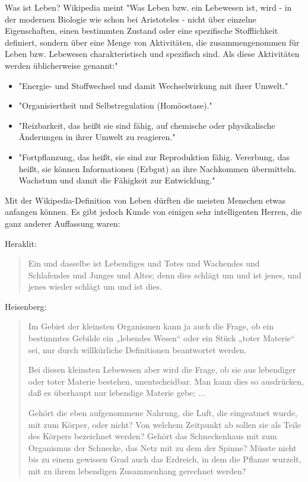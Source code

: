 \documentclass[12pt]{book}
\begin{document}
Was ist Leben? Wikipedia meint
"Was Leben bzw. ein Lebewesen ist, wird - in der modernen Biologie wie schon bei Aristoteles - nicht über einzelne Eigenschaften, einen bestimmten Zustand oder eine spezifische Stofflichkeit definiert, sondern über eine Menge von Aktivitäten, die zusammengenommen für Leben bzw. Lebewesen charakteristisch und spezifisch sind. Als diese Aktivitäten werden üblicherweise genannt:"
\begin{itemize}
\item "Energie- und Stoffwechsel und damit Wechselwirkung mit ihrer Umwelt."
\item "Organisiertheit und Selbstregulation (Homöostase)."
\item "Reizbarkeit, das heißt sie sind fähig, auf chemische oder physikalische Änderungen in ihrer Umwelt zu reagieren."
\item "Fortpflanzung, das heißt, sie sind zur Reproduktion fähig.
Vererbung, das heißt, sie können Informationen (Erbgut) an ihre Nachkommen übermitteln.
Wachstum und damit die Fähigkeit zur Entwicklung."
\end{itemize}

Mit der Wikipedia-Definition von Leben dürften die meisten Menschen etwas anfangen können. Es gibt jedoch Kunde von einigen sehr intelligenten Herren, die ganz anderer Auffassung waren:

Heraklit:
\begin{quote}\begin{tcolorbox}
Ein und dasselbe ist Lebendiges und Totes und Wachendes und Schlafendes und Junges und Altes; denn dies schlägt um und ist jenes, und jenes wieder schlägt um und ist dies.
\end{tcolorbox}\end{quote}
Heisenberg:
\begin{quote}\begin{tcolorbox}
Im Gebiet der kleinsten Organismen kann ja auch die Frage, ob ein bestimmtes Gebilde ein „lebendes Wesen“ oder ein Stück „toter Materie“ sei, nur durch willkürliche Definitionen beantwortet werden.

Bei diesen kleinsten Lebewesen aber wird die Frage, ob sie aus lebendiger oder toter Materie bestehen, unentscheidbar. Man kann dies so ausdrücken, daß es überhaupt nur lebendige Materie gebe; ...

Gehört die eben aufgenommene Nahrung, die Luft, die eingeatmet wurde, mit zum Körper, oder nicht? Von welchem Zeitpunkt ab sollen sie als Teile des Körpers bezeichnet werden? Gehört das Schneckenhaus mit zum Organismus der Schnecke, das Netz mit zu dem der Spinne? Müsste nicht bis zu einem gewissen Grad auch das Erdreich, in dem die Pflanze wurzelt, mit zu ihrem lebendigen Zusammenhang gerechnet werden?
\end{tcolorbox}\end{quote}
\end{document}
